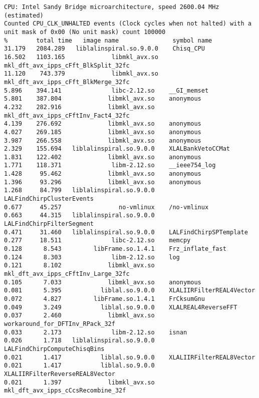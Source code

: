 \begin{table}[!b]
{\scriptsize
\begin{verbatim}
CPU: Intel Sandy Bridge microarchitecture, speed 2600.04 MHz (estimated)
Counted CPU_CLK_UNHALTED events (Clock cycles when not halted) with a unit mask of 0x00 (No unit mask) count 100000
%        total time   image name               symbol name
31.179   2084.289   liblalinspiral.so.9.0.0    Chisq_CPU
16.502   1103.165             libmkl_avx.so    mkl_dft_avx_ipps_cFft_BlkSplit_32fc
11.120    743.379             libmkl_avx.so    mkl_dft_avx_ipps_cFft_BlkMerge_32fc
5.896    394.141              libc-2.12.so    __GI_memset
5.801    387.804             libmkl_avx.so    anonymous
4.232    282.916             libmkl_avx.so    mkl_dft_avx_ipps_cFftInv_Fact4_32fc
4.139    276.692             libmkl_avx.so    anonymous
4.027    269.185             libmkl_avx.so    anonymous
3.987    266.558             libmkl_avx.so    anonymous
2.329    155.694   liblalinspiral.so.9.0.0    XLALBankVetoCCMat
1.831    122.402             libmkl_avx.so    anonymous
1.771    118.371              libm-2.12.so    __ieee754_log
1.428     95.462             libmkl_avx.so    anonymous
1.396     93.296             libmkl_avx.so    anonymous
1.268     84.799   liblalinspiral.so.9.0.0    LALFindChirpClusterEvents
0.677     45.257                no-vmlinux    /no-vmlinux
0.663     44.315   liblalinspiral.so.9.0.0    LALFindChirpFilterSegment
0.471     31.460   liblalinspiral.so.9.0.0    LALFindChirpSPTemplate
0.277     18.511              libc-2.12.so    memcpy
0.128      8.543         libFrame.so.1.4.1    Frz_inflate_fast
0.124      8.303              libm-2.12.so    log
0.121      8.102             libmkl_avx.so    mkl_dft_avx_ipps_cFftInv_Large_32fc
0.105      7.033             libmkl_avx.so    anonymous
0.081      5.395           liblal.so.9.0.0    XLALIIRFilterREAL4Vector
0.072      4.827         libFrame.so.1.4.1    FrCksumGnu
0.049      3.249           liblal.so.9.0.0    XLALREAL4ReverseFFT
0.037      2.460             libmkl_avx.so    workaround_for_DFTInv_RPack_32f
0.033      2.173              libm-2.12.so    isnan
0.026      1.718   liblalinspiral.so.9.0.0    LALFindChirpComputeChisqBins
0.021      1.417           liblal.so.9.0.0    XLALIIRFilterREAL8Vector
0.021      1.417           liblal.so.9.0.0    XLALIIRFilterReverseREAL8Vector
0.021      1.397             libmkl_avx.so    mkl_dft_avx_ipps_cCcsRecombine_32f
\end{verbatim}
}
\caption{%
\label{tab:lalapps-inspiral-mkl}
Complete profiling information for the fastest configuration of the retired
\texttt{lalapps\_inspiral} executable used for cost estimates in May 2014. The code uses the single-threaded Intel MKL FFT engine and is run on an Intel
E5-2670. The total run-time of the code is 6685 seconds, with a total of 3556
seconds spent in the MKL FFT routines. The next largest consumer of CPU time
is the \texttt{Chisq\_CPU} function that calculates the time-frequency
signal-based veto. Improvement of this algorithm, as described in
Section~\ref{sec:opt-chisq} was our first priority for optimization.
}
\end{table}


